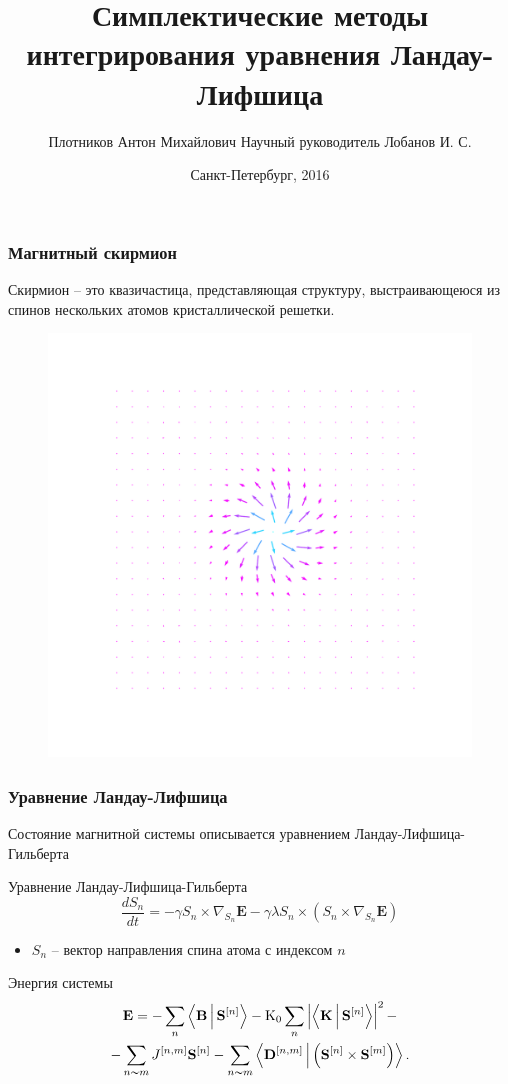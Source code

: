\documentclass[t]{beamer}
\title[Симплектические методы интегрирования ур-я Ландау-Лифшица]{%
    Симплектические методы интегрирования\linebreak
        уравнения Ландау-Лифшица
}
\author[Плотников Антон]{Плотников Антон Михайлович\linebreak\footnotesize
    Научный руководитель Лобанов И. С.}
\institute{Кафедра высшей математики}
\date{Санкт-Петербург, 2016}
\newcommand*{\Sn}{\ensuremath{\mathbf{S}^{[n]}}}
\begin{document}
\ITMOtitlepage

\begin{frame}
    \frametitle{Магнитный скирмион}
    Скирмион -- это квазичастица, представляющая структуру, выстраивающеюся из
    спинов нескольких атомов кристаллической решетки.
    \begin{figure}
        \centering
        \includegraphics[width=0.5\linewidth]{skyrmion4}
    \end{figure}
\end{frame}

\begin{frame}
    \frametitle{Уравнение Ландау-Лифшица}
    Состояние магнитной системы описывается уравнением Ландау-Лифшица-Гильберта

    \begin{block}{Уравнение Ландау-Лифшица-Гильберта}
        \begin{equation*}
            \frac{dS_n}{dt} = -\gamma S_n \times \nabla_{S_n} \mathbf E -
            \gamma\lambda S_n \times
            \left(S_n\times \nabla_{S_n} \mathbf E \right)
        \end{equation*}
    \end{block}

    \begin{itemize}
        \item $S_n$ -- вектор направления спина атома с индексом $n$
    \end{itemize}

    \pause

    \begin{block}{Энергия системы}
        \begin{multline*}
            \mathbf E = -\sum_n \Braket{\mathbf B | \Sn} - \mathrm{K_0} \sum_n
            \left| \Braket{\mathbf K | \Sn } \right|^2
            -\\-
            \sum_{n\thicksim m} J^{[n,m]} \Sn - \sum_{n\thicksim m}
            \Braket{\mathbf D^{[n,m]} | \left(\Sn \times \mathbf S^{[m]}\right)}.
        \end{multline*}
    \end{block}
\end{frame}
\end{document}
